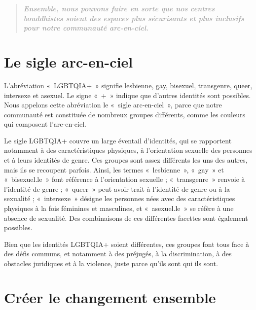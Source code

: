 \documentclass[12pt,openany]{book}
\begin{document}
\smallskip

\begingroup
\addtolength\leftmargin{-0.1in}
\begin{quote}
\centering
\textit{\large \textbf{\textcolor{darkgray}{Ensemble, nous pouvons faire en sorte que nos centres bouddhistes soient des espaces plus sécurisants et plus inclusifs pour notre communauté arc-en-ciel.}}}
\end{quote}
\endgroup

\section*{Le sigle arc-en-ciel}

\noindent L’abréviation \mbox{« \mbox{LGBTQIA+} »} signifie lesbienne, gay, bisexuel, transgenre, queer, intersexe et asexuel. Le signe \mbox{« + »} indique que d’autres identités sont possibles. Nous appelons cette abréviation le \mbox{« s}igle arc-en-cie\mbox{l »}, parce que notre communauté est constituée de nombreux groupes différents, comme les couleurs qui composent l’arc-en-ciel.

Le sigle \mbox{LGBTQIA+} couvre un large éventail d’identités, qui se rapportent notamment à des caractéristiques physiques, à l’orientation sexuelle des personnes et à leurs identités de genre. Ces groupes sont assez différents les uns des autres, mais ils se recoupent parfois.
Ainsi, les termes \mbox{« lesbienne »}, \mbox{« gay »} et \mbox{« bisexuel.le »} font référence à l’orientation sexuelle ; \mbox{« transgenre »} renvoie à l’identité de genre ; \mbox{« queer »} peut avoir trait à l’identité de genre ou à la sexualité ; \mbox{« intersexe »} désigne les personnes nées avec des caractéristiques physiques à la fois féminines et masculines, et \mbox{« asexuel.le »} se réfère à une absence de sexualité. Des combinaisons de ces différentes facettes sont également possibles.

Bien que les identités \mbox{LGBTQIA+} soient différentes, ces groupes font tous face à des défis communs, et notamment à des préjugés, à la discrimination, à des obstacles juridiques et à la violence, juste parce qu’ils sont qui ils sont.

\section*{Créer le changement ensemble}
\end{document}
